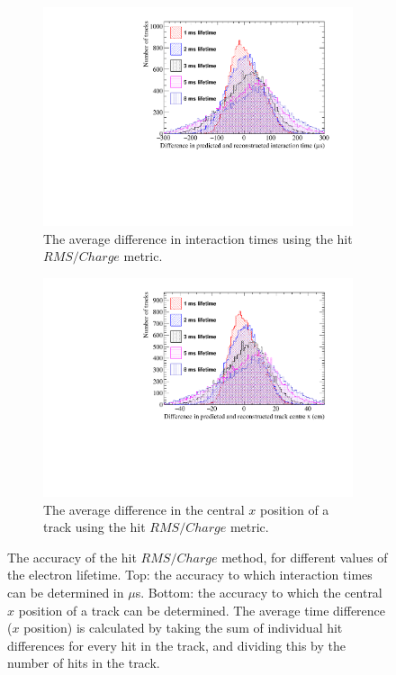 \begin{figure}
  \centering
  \begin{subfigure}{0.6\textwidth}
    \centering
    \includegraphics[width=\textwidth]{Canvas_AvDiff_T_RMS_Q_ElecLifetime}
    \caption{The average difference in interaction times using the hit $RMS/Charge$ metric.}
    \label{fig:DiffLifeStudy_AvDiff_RMS_Int_T}
  \end{subfigure}
  \begin{subfigure}{0.6\textwidth}
    \centering
    \includegraphics[width=\textwidth]{Canvas_AvDiff_X_RMS_Q_ElecLifetime}
    \caption{The average difference in the central $x$ position of a track using the hit $RMS/Charge$ metric.}
    \label{fig:DiffLifeStudy_AvDiff_RMS_Int_X}
  \end{subfigure}
  \caption[Comparing the accuracy of the hit $RMS$ method, as the electron lifetime changes]
          {The accuracy of the hit $RMS/Charge$ method, for different values of the electron lifetime. Top: the accuracy to which interaction times can be determined in $\mu$s. Bottom: the accuracy to which the central $x$ position of a track can be determined. The average time difference ($x$ position) is calculated by taking the sum of individual hit differences for every hit in the track, and dividing this by the number of hits in the track.}
  \label{fig:DiffLifeStudy_AvDiff_RMS_Int}
\end{figure}

